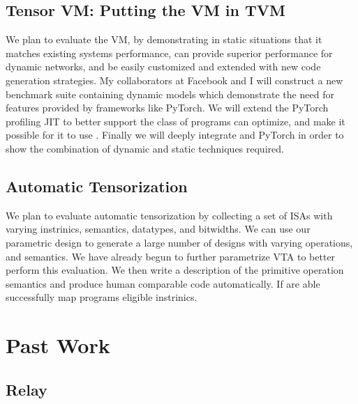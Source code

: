 \subsection{Tensor VM: Putting the VM in TVM}

We plan to evaluate the VM, by demonstrating in
  static situations that it matches existing
  systems performance, can provide superior performance
  for dynamic networks, and be easily customized
  and extended with new code generation strategies.
My collaborators at Facebook and I will construct
  a new benchmark suite containing dynamic models
  which demonstrate the need for features provided by frameworks
  like PyTorch.
We will extend the PyTorch profiling JIT to better support
  the class of programs \relay can optimize, and make it
  possible for it to use \relay.
Finally we will deeply integrate \relay and PyTorch
   in order to show the combination of dynamic and
   static techniques required.

\subsection{Automatic Tensorization}

We plan to evaluate automatic tensorization by collecting
  a set of ISAs with varying instrinics, semantics,
  datatypes, and bitwidths.
We can use our parametric design \vta to generate a large
  number of designs with varying operations, and semantics.
We have already begun to further parametrize VTA to better
  perform this evaluation.
We then write a description of the primitive operation
  semantics and produce human comparable code
  automatically.
If are able successfully map programs eligible instrinics.



\section{Past Work}
\label{sec:past}


\subsection{Relay}

